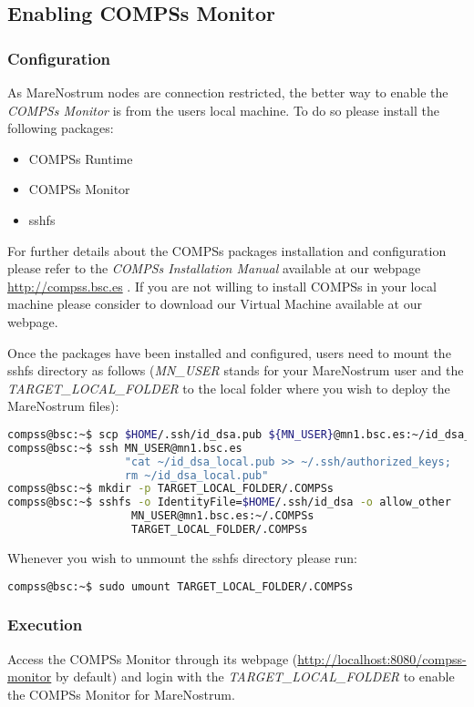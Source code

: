 \subsection{Enabling COMPSs Monitor}
\subsubsection{Configuration}
As MareNostrum nodes are connection restricted, the better way to enable the \textit{COMPSs Monitor} is from the users local machine. 
To do so please install the following packages:
\begin{itemize}
 \item COMPSs Runtime
 \item COMPSs Monitor
 \item sshfs
\end{itemize}

For further details about the COMPSs packages installation and configuration please refer to the \textit{COMPSs Installation Manual} 
available at our webpage \url{http://compss.bsc.es} . If you are not willing to install COMPSs in your local machine please consider
to download our Virtual Machine available at our webpage. 
\newline

Once the packages have been installed and configured, users need to mount the sshfs directory as follows (\textit{MN\_USER} stands for 
your MareNostrum user and the \textit{TARGET\_LOCAL\_FOLDER} to the local folder where you wish to deploy the MareNostrum files):
\begin{lstlisting}[language=bash]
compss@bsc:~$ scp $HOME/.ssh/id_dsa.pub ${MN_USER}@mn1.bsc.es:~/id_dsa_local.pub
compss@bsc:~$ ssh MN_USER@mn1.bsc.es 
                  "cat ~/id_dsa_local.pub >> ~/.ssh/authorized_keys; 
                  rm ~/id_dsa_local.pub"
compss@bsc:~$ mkdir -p TARGET_LOCAL_FOLDER/.COMPSs
compss@bsc:~$ sshfs -o IdentityFile=$HOME/.ssh/id_dsa -o allow_other 
                   MN_USER@mn1.bsc.es:~/.COMPSs 
                   TARGET_LOCAL_FOLDER/.COMPSs
\end{lstlisting}

Whenever you wish to unmount the sshfs directory please run:
\begin{lstlisting}[language=bash]
compss@bsc:~$ sudo umount TARGET_LOCAL_FOLDER/.COMPSs
\end{lstlisting}

\subsubsection{Execution}
Access the COMPSs Monitor through its webpage (\url{http://localhost:8080/compss-monitor} by default) and login with the 
\textit{TARGET\_LOCAL\_FOLDER} to enable the COMPSs Monitor for MareNostrum. 
